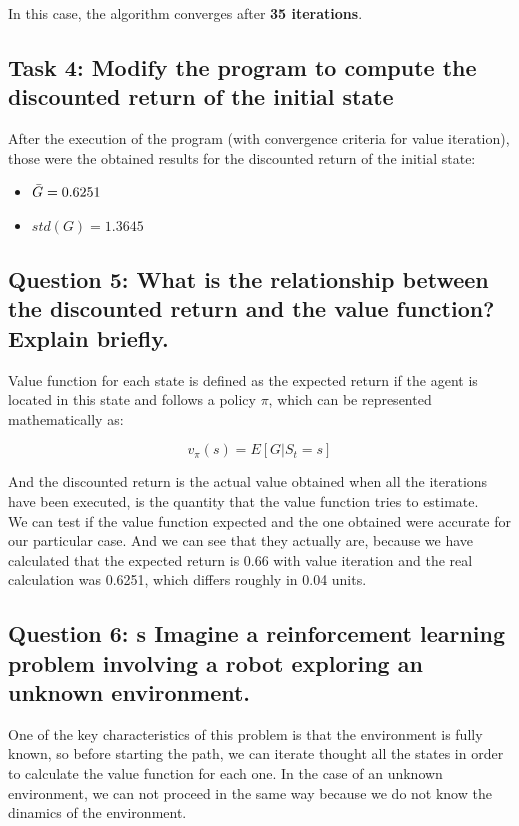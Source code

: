 \documentclass[12pt]{article}
\begin{document}
In this case, the algorithm converges after \textbf{35 iterations}.

\subsection{Task 4: Modify the program to compute the discounted return of the initial state}

After the execution of the program (with convergence criteria for value iteration), those were the obtained results for the discounted return of the initial state:

\begin{itemize}
    \item $\Bar{G} = 0.6251$
    \item $std(G) = 1.3645$
\end{itemize}

\subsection{Question 5: What is the relationship between the discounted return and the value function? Explain briefly.}

Value function for each state is defined as the expected return if the agent is located in this state and follows a policy $\pi$, which can be represented mathematically as:

\begin{equation}
    v_\pi(s) = E[G | S_t= s]
\end{equation}

And the discounted return is the actual value obtained when all the iterations have been executed, is the quantity that the value function tries to estimate. \\

We can test if the value function expected and the one obtained were accurate for our particular case. And we can see that they actually are, because we have calculated that the expected return is 0.66 with value iteration and the real calculation was 0.6251, which differs roughly in 0.04 units.

\subsection{Question 6: s Imagine a reinforcement learning problem involving a robot exploring an unknown environment.}

One of the key characteristics of this problem is that the environment is fully known, so before starting the path, we can iterate thought all the states in order to calculate the value function for each one. In the case of an unknown environment, we can not proceed in the same way because we do not know the dinamics of the environment.
\end{document}
